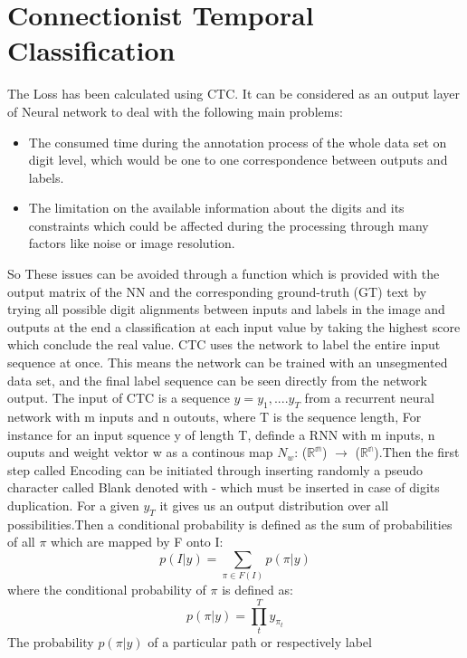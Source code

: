 \section{Connectionist Temporal Classification}\label{sec:ctc}

The Loss has been calculated using CTC. It can be considered as an output layer of Neural network to deal with the following main problems:
\begin{itemize}
\item The consumed time during the annotation process of the whole data set on
digit level, which would be one to one correspondence between outputs and
labels.
\item The limitation on the available information about the digits and its
constraints which could be affected during the processing through many factors
like noise or image resolution.
\end{itemize}
So These issues can be avoided through a function which is provided with the
output matrix of the NN and the corresponding ground-truth (GT) text by trying
all possible digit alignments between inputs and labels in the image and outputs
at the end a classification at each input value by taking the highest score
which conclude the real value. CTC uses the network to label the entire input
sequence at once. This means the network can be trained with an unsegmented data
set, and the final label sequence can be seen directly from the network output.
The input of CTC is a sequence $y=y_{1},....y_{T}$ from a recurrent neural
network with m inputs and n outouts, where T is the sequence length, For
instance for an input squence y of length T, definde a RNN with m inputs, n
ouputs and weight vektor w as a continous map $N_w$: ($\mathbb{R^m}$)
$\rightarrow$  ($\mathbb{R^n}$).Then the first step called Encoding can be
initiated through inserting randomly a pseudo character called Blank denoted
with {-} which must be inserted in case of digits duplication. For a given
$y_{T}$ it gives us an output distribution over all possibilities.Then a
conditional probability is defined as the sum of probabilities of all $\pi$
which are mapped by F onto I:
\begin{equation}
p( I | y)=\sum_{\pi \in F(I)} p( \pi | y )
\label{eq3}
\end{equation}
where the conditional probability of $\pi$ is defined as: 
\begin{equation}
p( \pi | y ) =\prod_t^T y_{\pi_{t}}
\label{eq3}
\end{equation}
The probability $p( \pi | y )$ of a particular path or respectively label
